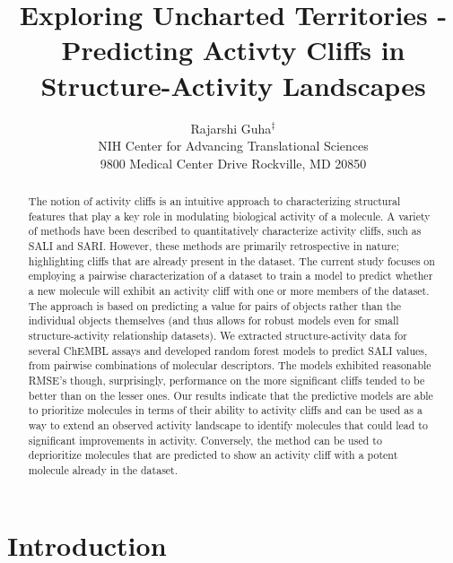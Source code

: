 \documentclass[letterpaper, 12pt]{article}
\begin{document}
\title{Exploring Uncharted Territories - Predicting Activty Cliffs in
  Structure-Activity Landscapes}
\author{Rajarshi Guha${}^{\ddagger}$\\
NIH Center for Advancing Translational Sciences \\ 9800 Medical Center Drive  Rockville, MD 20850}
\date{}

\maketitle
\begin{abstract}
  The notion of activity cliffs is an intuitive approach to characterizing structural features that
  play a key role in modulating biological activity of a molecule. A variety of methods have been
  described to quantitatively characterize activity cliffs, such as SALI and SARI. However, these
  methods are primarily retrospective in nature; highlighting cliffs that are already present in the
  dataset. The current study focuses on employing a pairwise characterization of a dataset to train
  a model to predict whether a new molecule will exhibit an activity cliff with one or more members
  of the dataset. The approach is based on predicting a value for pairs of objects rather than the
  individual objects themselves (and thus allows for robust models even for small structure-activity
  relationship datasets). We extracted structure-activity data for several ChEMBL assays and
  developed random forest models to predict SALI values, from pairwise combinations of molecular
  descriptors. The models exhibited reasonable RMSE's though, surprisingly, performance on the more
  significant cliffs tended to be better than on the lesser ones. Our results indicate that the
  predictive models are able to prioritize molecules in terms of their ability to activity cliffs
  and can be used as a way to extend an observed activity landscape to identify molecules that could
  lead to significant improvements in activity. Conversely, the method can be used to deprioritize
  molecules that are predicted to show an activity cliff with a potent molecule already in the
  dataset.
\end{abstract}

\section{Introduction}
\end{document}
